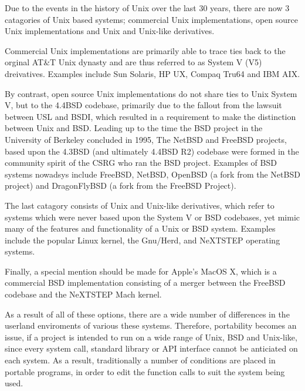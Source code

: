 
Due to the events in the history of Unix over the last 30 years, there
are now 3 catagories of Unix based systems; commercial Unix
implementations, open source Unix implementations and Unix and Unix-like 
derivatives.


Commercial Unix implementations are primarily able to trace ties back to
the orginal AT\&T Unix dynasty and are thus referred to as System V (V5)
dreivatives. Examples include Sun Solaris, HP UX, Compaq
Tru64 and IBM AIX. 


By contrast, open source Unix implementations do not share ties to Unix 
System V, but to the 4.4BSD codebase, primarily due to the fallout from 
the lawsuit between USL and BSDI, which resulted in a requirement to
make the distinction between Unix and BSD. Leading up to the time the 
BSD project in the University of Berkeley concluded in 1995, The NetBSD
and FreeBSD projects, based upon the 4.3BSD (and ultimately 4.4BSD R2) 
codebase were formed in the community spirit of the CSRG who ran the BSD
project. Examples of BSD systems nowadsys include FreeBSD, NetBSD,
OpenBSD (a fork from the NetBSD project) and DragonFlyBSD (a fork from
the FreeBSD Project).


The last catagory consists of Unix and Unix-like derivatives, which
refer to systems which were never based upon the System V or BSD
codebases, yet mimic many of the features and functionality of a Unix or
BSD system. Examples include the popular Linux kernel, the Gnu/Herd,
and NeXTSTEP operating systems.


Finally, a special mention should be made for Apple's MacOS X, which is
a commercial BSD implementation consisting of a merger between the
FreeBSD codebase and the NeXTSTEP Mach kernel.


As a result of all of these options, there are a wide number of
differences in the userland enviroments of various these systems.
Therefore, portability becomes an issue, if a project is intended to run
on a wide range of Unix, BSD and Unix-like, since every system call, 
standard library or API interface cannot be anticiated on each system.
As a result, traditionally a number of conditions are placed in portable
programs, in order to edit the function calls to suit the system being
used.
